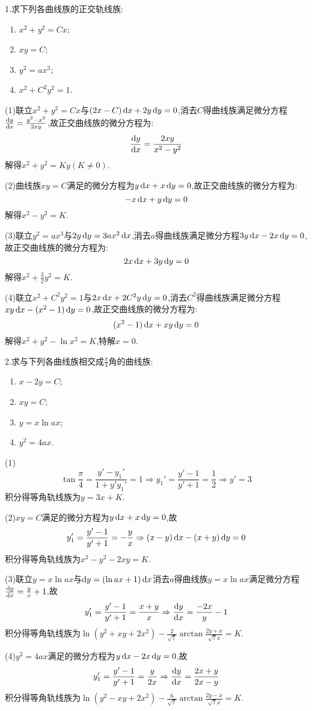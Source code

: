 1.求下列各曲线族的正交轨线族:
\begin{enumerate}[(1)]
\item $x^2+y^2=Cx$;
\item $xy=C$;
\item $y^2=ax^3$;
\item $x^2+C^2y^2=1$.
\end{enumerate}

\begin{solve}
(1)联立$x^2+y^2=Cx$与$(2x-C)\mathop{}\!\mathrm{d} x+2y\mathop{}\!\mathrm{d} y=0$,消去$C$得曲线族满足微分方程$\frac{\mathop{}\!\mathrm{d} y}{\mathop{}\!\mathrm{d} x}=\frac{y^2-x^2}{2xy}$,故正交曲线族的微分方程为:
\[\frac{\mathop{}\!\mathrm{d} y}{\mathop{}\!\mathrm{d} x}=\frac{2xy}{x^2-y^2}\]
解得$x^2+y^2=Ky(K\neq0)$.

(2)曲线族$xy=C$满足的微分方程为$y\mathop{}\!\mathrm{d} x+x\mathop{}\!\mathrm{d} y=0$,故正交曲线族的微分方程为:
\[-x\mathop{}\!\mathrm{d} x+y\mathop{}\!\mathrm{d} y=0\]
解得$x^2-y^2=K$.

(3)联立$y^2=ax^3$与$2y\mathop{}\!\mathrm{d} y=3ax^2\mathop{}\!\mathrm{d} x$,消去$a$得曲线族满足微分方程$3y\mathop{}\!\mathrm{d} x-2x\mathop{}\!\mathrm{d} y=0$,故正交曲线族的微分方程为:
\[2x\mathop{}\!\mathrm{d} x+3y\mathop{}\!\mathrm{d} y=0\]
解得$x^2+\frac{3}{2}y^2=K$.

(4)联立$x^2+C^2y^2=1$与$2x\mathop{}\!\mathrm{d} x+2C^2y\mathop{}\!\mathrm{d} y=0$,消去$C^2$得曲线族满足微分方程$xy\mathop{}\!\mathrm{d} x-(x^2-1)\mathop{}\!\mathrm{d} y=0$,故正交曲线族的微分方程为:
\[(x^2-1)\mathop{}\!\mathrm{d} x+xy\mathop{}\!\mathrm{d} y=0\]
解得$x^2+y^2-\ln x^2=K$,特解$x=0$.
\end{solve}


2.求与下列各曲线族相交成$\frac{\pi}{4}$角的曲线族:
\begin{enumerate}[(1)]
\item $x-2y=C$;
\item $xy=C$;
\item $y=x\ln ax$;
\item $y^2=4ax$.
\end{enumerate}

\begin{solve}
(1)\[\tan\frac{\pi}{4}=\frac{y'-y_1'}{1+y'y_1'}=1\Rightarrow y_1'=\frac{y'-1}{y'+1}=\frac{1}{2}\Rightarrow y'=3\]
积分得等角轨线族为$y=3x+K$.

(2)$xy=C$满足的微分方程为$y\mathop{}\!\mathrm{d} x+x\mathop{}\!\mathrm{d} y=0$,故
\[y_1'=\frac{y'-1}{y'+1}=-\frac{y}{x}\Rightarrow(x-y)\mathop{}\!\mathrm{d} x-(x+y)\mathop{}\!\mathrm{d} y=0\]
积分得等角轨线族为$x^2-y^2-2xy=K$.

(3)联立$y=x\ln ax$与$\mathop{}\!\mathrm{d} y=(\ln ax+1)\mathop{}\!\mathrm{d} x$消去$a$得曲线族$y=x\ln ax$满足微分方程$\frac{\mathop{}\!\mathrm{d} y}{\mathop{}\!\mathrm{d} x}=\frac{y}{x}+1$,故
\[y_1'=\frac{y'-1}{y'+1}=\frac{x+y}{x}\Rightarrow\frac{\mathop{}\!\mathrm{d} y}{\mathop{}\!\mathrm{d} x}=\frac{-2x}{y}-1\]
积分得等角轨线族为$\ln(y^2+xy+2x^2)-\frac{2}{\sqrt{7}}\arctan\frac{2y+x}{\sqrt{7}x}=K$.

(4)$y^2=4ax$满足的微分方程为$y\mathop{}\!\mathrm{d} x-2x\mathop{}\!\mathrm{d} y=0$,故
\[y_1'=\frac{y'-1}{y'+1}=\frac{y}{2x}\Rightarrow\frac{\mathop{}\!\mathrm{d} y}{\mathop{}\!\mathrm{d} x}=\frac{2x+y}{2x-y}\]
积分得等角轨线族为$\ln(y^2-xy+2x^2)-\frac{6}{\sqrt{7}}\arctan\frac{2y-x}{\sqrt{7}x}=K$.
\end{solve}


